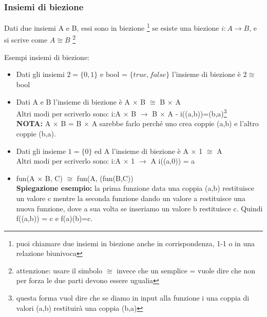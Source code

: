 \subsubsection{Insiemi di biezione}
\begin{definition}
Dati due insiemi A e B, essi sono in biezione
\footnote{puoi chiamare due insiemi in biezione anche in corrispondenza, 1-1 o in una relazione biunivoca}
se esiste una biezione $i: A \rightarrow B$, e si scrive come $A \cong B$
\footnote{attenzione: usare il simbolo $\cong$ invece che un semplice = vuole dire che non per forza le due parti devono essere ugualia}
\end{definition}
\begin{example}
    Esempi insiemi di biezione:
    \begin{itemize}
        \item Dati gli insiemi $2 = \{0,1\}$ e bool = $\{true, false\}$ \hspace{.3cm} l'insieme di biezione è $2 \cong$ bool
        \item Dati A e B \hspace{.3cm} l'insieme di biezione è A $\times$ B $\cong$ B $\times$ A \\
        Altri modi per scriverlo sono: \hspace{.3cm} i:A $\times$ B $\longrightarrow$ B $\times$ A \: - \: i((a,b))=(b,a)\footnote{questa forma vuol dire che se diamo in input alla funzione i una coppia di valori (a,b) restituirà una coppia (b,a)}\\
        \textbf{NOTA:} A $\times$ B = B $\times$ A sarebbe farlo perché uno crea coppie (a,b) e l'altro coppie (b,a).
        \item Dati gli insieme $1 = \{0\}$ ed A \hspace{.3cm} l'insieme di biezione è A $\times$ 1 $\cong$ A \\
        Altri modi per scriverlo sono: \hspace{.3cm} i:A $\times$ 1 $\longrightarrow$ A \hspace{.3cm} i((a,0)) = a
        \item fun(A $\times$ B, C) $\cong$ fun(A, (fun(B,C))\\
        \textbf{Spiegazione esempio:} la prima funzione data una coppia (a,b) restituisce un valore c mentre la seconda funzione dando un valore a restituisce una nuova funzione, dove a sua volta se inseriamo un valore b restituisce c. Quindi f((a,b)) = c e f(a)(b)=c.
    \end{itemize}
\end{example}
